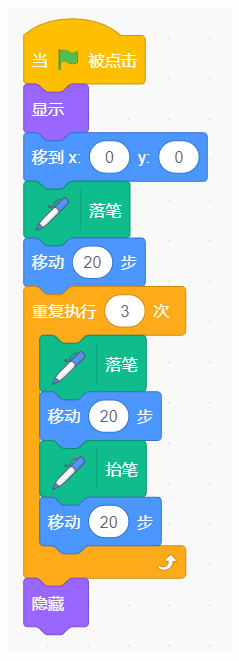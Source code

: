 \documentclass[10pt, a4paper]{article}
\begin{document}
\begin{enumerate}
        \begin{figure}[htbp]
            \centering
            \begin{minipage}[t]{.1\textwidth}
                \centering
                \includegraphics[width=\textwidth]{33.png}

\end{minipage}
\end{figure}
\end{enumerate}
\end{document}
